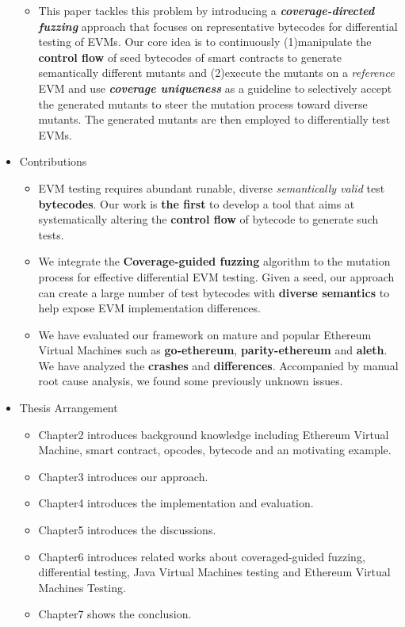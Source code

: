 \documentclass[a4paper]{article}
\begin{document}
\begin{itemize}
\begin{itemize}
			\item This paper tackles this problem by introducing a \textit{\textbf{coverage-directed fuzzing}} approach that focuses on representative bytecodes for differential testing of EVMs. Our core idea is to continuously (1)manipulate the \textbf{control flow} of seed bytecodes of smart contracts to generate semantically different mutants and (2)execute the mutants on a \textit{reference} EVM and use \textit{\textbf{coverage uniqueness}} as a guideline to selectively accept the generated mutants to steer the mutation process toward diverse mutants. The generated mutants are then employed to differentially test EVMs.
		\end{itemize}
		\item Contributions
		\begin{itemize}
			\item EVM testing requires abundant runable, diverse \textit{semantically valid} test \textbf{bytecodes}. Our work is \textbf{the first} to develop a tool that aims at systematically altering the \textbf{control flow} of bytecode to generate such tests.
			\item We integrate the \textbf{Coverage-guided fuzzing} algorithm to the mutation process for effective differential EVM testing. Given a seed, our approach can create a large number of test bytecodes with \textbf{diverse semantics} to help expose EVM implementation differences.
			\item We have evaluated our framework on mature and popular Ethereum Virtual Machines such as \textbf{go-ethereum}, \textbf{parity-ethereum} and \textbf{aleth}. We have analyzed the \textbf{crashes} and \textbf{differences}. Accompanied by manual root cause analysis, we found some previously unknown issues.
		\end{itemize}
		\item Thesis Arrangement
		\begin{itemize}
			\item Chapter2 introduces background knowledge  including Ethereum Virtual Machine, smart contract, opcodes, bytecode and an motivating example. 
			\item Chapter3 introduces our approach.
			\item Chapter4 introduces the implementation and evaluation.
			\item Chapter5 introduces the discussions.
			\item Chapter6 introduces related works about coveraged-guided fuzzing, differential testing, Java Virtual Machines testing and Ethereum Virtual Machines Testing.
			\item Chapter7 shows the conclusion.
		\end{itemize}
	\end{itemize}
	
\end{document}
